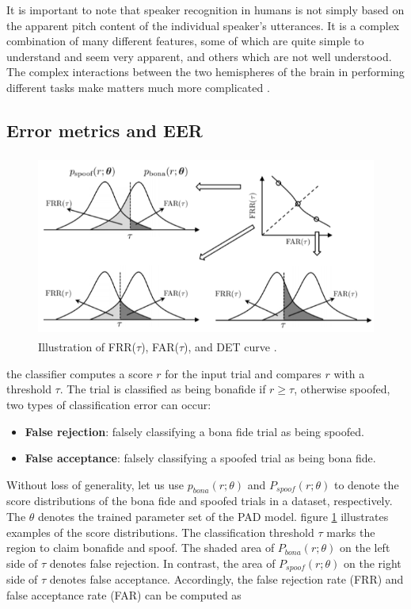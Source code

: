It is important to note that speaker recognition in humans is not simply based on the apparent pitch content of the individual speaker’s utterances. It is a complex combination of many different features, some of which are quite simple to understand and seem very apparent, and others which are not well understood. The complex interactions between the two hemispheres of the brain in performing different tasks make matters much more complicated \cite{beigi2011speaker}.

\subsection{Error metrics and EER}

\begin{figure}[htbp!]
    \centering
    \includegraphics[height=6cm]{figures/eer.png}
    \caption{ Illustration of FRR($\tau$), FAR($\tau$), and DET curve \cite{wang2022practical}.}
    \label{fig:error}
\end{figure}

the classifier computes a score $r$ for the 
input trial and compares $r$ with a threshold $\tau$. The trial is classified as being
bonafide if $r \geq \tau$, otherwise
spoofed, two types of classification error can occur:

\begin{itemize}
    \item \textbf{False rejection}: falsely classifying a bona fide trial as being spoofed.
    \item \textbf{False acceptance}: falsely classifying a spoofed trial as being bona fide.
\end{itemize}

Without loss of generality, let us use \(p_{bona}(r;\theta)\) and \(P_{spoof}(r;\theta)\) to denote the score distributions of the bona fide and spoofed trials in a dataset, respectively.
The \(\theta\) denotes the trained parameter set of the PAD model. figure \ref{fig:error} illustrates examples of the score distributions. The classification threshold \(\tau\) marks the
region to claim bonafide and spoof. The shaded area of \(P_{bona}(r;\theta)\) on the left
side of \(\tau\) denotes false rejection. In contrast, the area of \(P_{spoof}(r;\theta)\) on the right side of \(\tau\) denotes false acceptance. Accordingly, the false rejection rate (FRR) and false acceptance rate (FAR) can be computed as 

